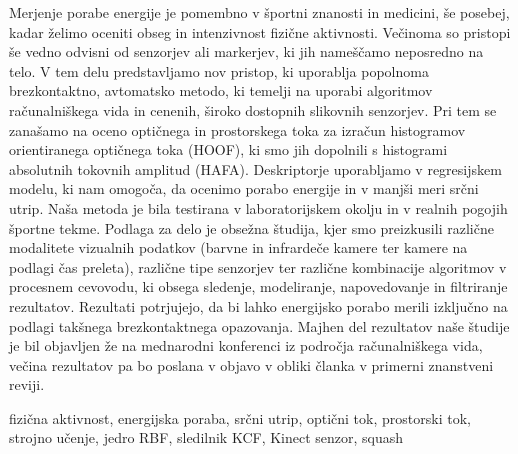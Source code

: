 \povzetek
Merjenje porabe energije je pomembno v športni znanosti in medicini, še posebej, kadar želimo oceniti obseg in intenzivnost fizične aktivnosti. Večinoma so pristopi še vedno odvisni od senzorjev ali markerjev, ki jih nameščamo neposredno na telo. V tem delu predstavljamo nov pristop, ki uporablja popolnoma brezkontaktno, avtomatsko metodo, ki temelji na uporabi algoritmov računalniškega vida in cenenih, široko dostopnih slikovnih senzorjev. Pri tem se zanašamo na oceno optičnega in prostorskega toka za izračun histogramov orientiranega optičnega toka (HOOF), ki smo jih dopolnili s histogrami absolutnih tokovnih amplitud (HAFA). Deskriptorje uporabljamo v regresijskem modelu, ki nam omogoča, da ocenimo porabo energije in v manjši meri srčni utrip. Naša metoda je bila testirana v laboratorijskem okolju in v realnih pogojih športne tekme. Podlaga za delo je obsežna študija, kjer smo preizkusili različne modalitete vizualnih podatkov (barvne in infrardeče kamere ter kamere na podlagi čas preleta), različne tipe senzorjev ter različne kombinacije algoritmov v procesnem cevovodu, ki obsega sledenje, modeliranje, napovedovanje in filtriranje rezultatov.
Rezultati potrjujejo, da bi lahko energijsko porabo merili izključno na podlagi takšnega brezkontaktnega opazovanja. Majhen del rezultatov naše študije je bil objavljen že na mednarodni konferenci iz področja računalniškega vida, večina rezultatov pa bo poslana v objavo v obliki članka v primerni znanstveni reviji.

\kljucnebesede fizična aktivnost, energijska poraba, srčni utrip, optični tok, prostorski tok, strojno učenje, jedro RBF, sledilnik KCF, Kinect senzor, squash